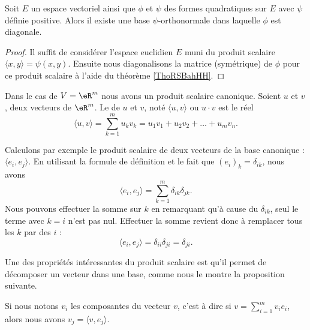\begin{corollary}   \label{CorSMHpoVK}
    Soit \( E\) un espace vectoriel ainsi que \( \phi\) et \( \psi\) des formes quadratiques sur \( E\) avec \( \psi\) définie positive. Alors il existe une base \( \psi\)-orthonormale dans laquelle \( \phi\) est diagonale.
\end{corollary}

\begin{proof}
    Il suffit de considérer l'espace euclidien \( E\) muni du produit scalaire \( \langle x, y\rangle =\psi(x,y)\). Ensuite nous diagonalisons la matrice (symétrique) de \( \phi\) pour ce produit scalaire à l'aide du théorème \ref{ThoRSBahHH}.
\end{proof}

\begin{definition}      \label{DefYNWUFc}
    Dans le cas de \( V=\eR^m\) nous avons un produit scalaire canonique. Soient $u$ et $v$, deux vecteurs de $\eR^m$. Le  de $u$ et $v$, noté $\langle u, v\rangle $ ou $u\cdot v$ est le réel
	\begin{equation}		\label{EqDefProdScalsumii}
		\langle u, v\rangle =\sum_{k=1}^m u_kv_k=u_1v_1+u_2v_2+\ldots+u_mv_n.
	\end{equation}
\end{definition}

Calculons par exemple le produit scalaire de deux vecteurs de la base canonique : $\langle e_i, e_j\rangle $. En utilisant la formule de définition et le fait que $(e_i)_k=\delta_{ik}$, nous avons
\begin{equation}
	\langle e_i, e_j\rangle =\sum_{k=1}^m\delta_{ik}\delta_{jk}.
\end{equation}
Nous pouvons effectuer la somme sur $k$ en remarquant qu'à cause du $\delta_{ik}$, seul le terme avec $k=i$ n'est pas nul. Effectuer la somme revient donc à remplacer tous les $k$ par des $i$ :
\begin{equation}
	\langle e_i, e_j\rangle =\delta_{ii}\delta_{ji}=\delta_{ji}.
\end{equation}

Une des propriétés intéressantes du produit scalaire est qu'il permet de décomposer un vecteur dans une base, comme nous le montre la proposition suivante.

\begin{proposition}		\label{PropScalCompDec}
	Si nous notons $v_i$ les composantes du vecteur $v$, c'est à dire si $v=\sum_{i=1}^m v_ie_i$, alors nous avons $v_j=\langle v, e_j\rangle $.
\end{proposition}

